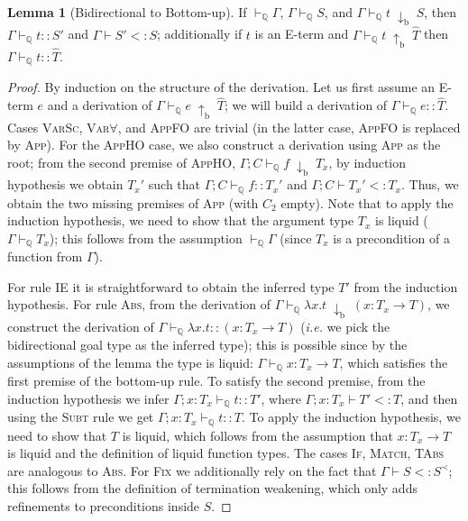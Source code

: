 \documentclass[10pt,preprint]{sigplanconf-pldi16}
\makeatletter
\theoremstyle{definition}
\newtheorem{lemma}{Lemma}
\newcommand{\Subt}{<:}
\newcommand{\env}{\Gamma}
\newcommand{\produceB}{\;{\mathrm{\uparrow_b}}\;}
\newcommand{\consumeB}{\;{\mathrm{\downarrow_b}}\;}
\newcommand{\funT}[3]{{#1}\colon {#2} \to {#3}}
\newcommand{\before}{\prec}
\newcommand{\quals}{\mathbb{Q}}
\newcommand{\entailsQ}{\vdash_{\quals}}
\newcommand{\ie}{\textit{i.e.}\@\xspace}
\makeatother
\begin{document}
\begin{lemma}[Bidirectional to Bottom-up]\label{lemma:bidir-to-bu}
If $\entailsQ \env$, $\env\entailsQ S$, and $\env \entailsQ t \consumeB S$, then $\env\entailsQ t :: S'$ and $\env \vdash S' \Subt S$;
additionally if $t$ is an E-term and $\env \entailsQ t \produceB \hat{T}$ then $\env\entailsQ t :: \hat{T}$.
\end{lemma}
\begin{proof}
By induction on the structure of the derivation.
Let us first assume an E-term $e$ and a derivation of $\env \entailsQ e \produceB \hat{T}$;
we will build a derivation of $\env \entailsQ e :: \hat{T}$.
Cases \textsc{VarSc}, \textsc{Var$\forall$}, and \textsc{AppFO} are trivial
(in the latter case, \textsc{AppFO} is replaced by \textsc{App}).
For the \textsc{AppHO} case, we also construct a derivation using \textsc{App} as the root;
from the second premise of \textsc{AppHO}, $\env;C \entailsQ f \consumeB T_x$, 
by induction hypothesis we obtain $T_x'$ such that $\env;C \entailsQ f :: T_x'$ and $\env;C \vdash T_x' \Subt T_x$.
Thus, we obtain the two missing premises of \textsc{App} (with $C_2$ empty).
Note that to apply the induction hypothesis, we need to show that the argument type $T_x$ is liquid ($\env\entailsQ T_x$);
this follows from the assumption $\entailsQ \env$ (since $T_x$ is a precondition of a function from $\env$).

For rule \textsc{IE} it is straightforward to obtain the inferred type $T'$ from the induction hypothesis.
For rule \textsc{Abs}, from the derivation of $\env \entailsQ \lambda x.t \consumeB (\funT{x}{T_x}{T})$,
we construct the derivation of $\env \entailsQ \lambda x.t :: (\funT{x}{T_x}{T})$ (\ie we pick the bidirectional goal type as the inferred type);
this is possible since by the assumptions of the lemma the type is liquid: $\env\entailsQ \funT{x}{T_x}{T}$,
which satisfies the first premise of the bottom-up rule.
To satisfy the second premise,
from the induction hypothesis we infer $\env;x:T_x \entailsQ t :: T'$, where $\env;x:T_x\vdash T'\Subt T$,
and then using the \textsc{Subt} rule we get $\env;x:T_x \entailsQ t :: T$.
To apply the induction hypothesis, we need to show that $T$ is liquid,
which follows from the assumption that $\funT{x}{T_x}{T}$ is liquid and the definition of liquid function types.
The cases \textsc{If}, \textsc{Match}, \textsc{TAbs} are analogous to \textsc{Abs}.
For \textsc{Fix} we additionally rely on the fact that $\env\vdash S\Subt S^\before$;
this follows from the definition of termination weakening, 
which only adds refinements to preconditions inside $S$.
\end{proof}
\end{document}
